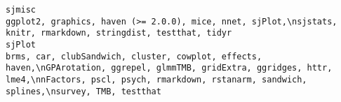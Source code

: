 \documentclass[
  letterpaper,
  DIV=11,
  numbers=noendperiod]{scrreprt}
\begin{document}
\begin{verbatim}
sjmisc                                                                                                                                                                                                                                                                                                                                                                                                                                                                                                                                                                                                                                                                                                                                                                                                                                                                                                                                                                                                                                                                                                                                                                                       ggplot2, graphics, haven (>= 2.0.0), mice, nnet, sjPlot,\nsjstats, knitr, rmarkdown, stringdist, testthat, tidyr
sjPlot                                                                                                                                                                                                                                                                                                                                                                                                                                                                                                                                                                                                                                                                                                                                                                                                                                                                                                                                                                                                                                                                                     brms, car, clubSandwich, cluster, cowplot, effects, haven,\nGPArotation, ggrepel, glmmTMB, gridExtra, ggridges, httr, lme4,\nnFactors, pscl, psych, rmarkdown, rstanarm, sandwich, splines,\nsurvey, TMB, testthat

\end{verbatim}
\end{document}
